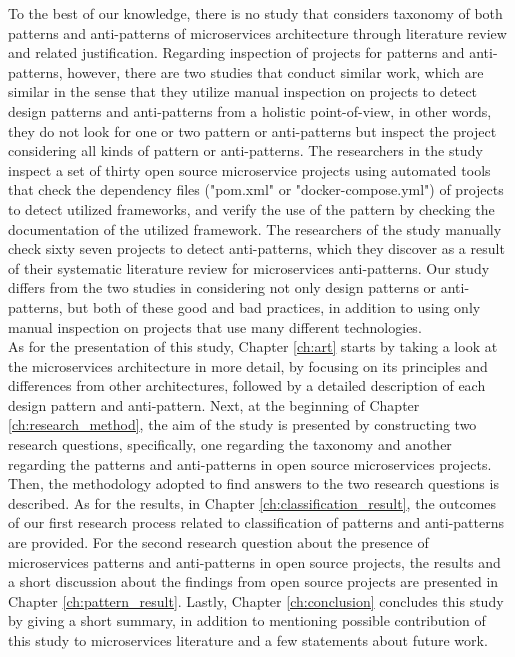 \documentclass{Configuration_Files/PoliMi3i_thesis}
\begin{document}
To the best of our knowledge, there is no study that considers taxonomy of both patterns and anti-patterns of microservices architecture through literature review and related justification.
Regarding inspection of projects for patterns and anti-patterns, however, there are two studies that conduct similar work, which are similar in the sense that they utilize manual inspection on projects to detect design patterns and anti-patterns from a holistic point-of-view, in other words, they do not look for one or two pattern or anti-patterns but inspect the project considering all kinds of pattern or anti-patterns.
The researchers in the study \cite{8719492} inspect a set of thirty open source microservice projects using automated tools that check the dependency files ("pom.xml" or "docker-compose.yml") of projects to detect utilized frameworks, and verify the use of the pattern by checking the documentation of the utilized framework.
The researchers of the study \cite{10.1145/3424771.3424812} manually check sixty seven projects to detect anti-patterns, which they discover as a result of their systematic literature review for microservices anti-patterns.
Our study differs from the two studies in considering not only design patterns or anti-patterns, but both of these good and bad practices, in addition to using only manual inspection on projects that use many different technologies.
\\
As for the presentation of this study, Chapter \ref{ch:art} starts by taking a look at the microservices architecture in more detail, by focusing on its principles and differences from other architectures, followed by a detailed description of each design pattern and anti-pattern.
Next, at the beginning of Chapter \ref{ch:research_method}, the aim of the study is presented by constructing two research questions, specifically, one regarding the taxonomy and another regarding the patterns and anti-patterns in open source microservices projects.
Then, the methodology adopted to find answers to the two research questions is described.
As for the results, in Chapter \ref{ch:classification_result}, the outcomes of our first research process related to classification of patterns and anti-patterns are provided.
For the second research question about the presence of microservices patterns and anti-patterns in open source projects, the results and a short discussion about the findings from open source projects are presented in Chapter \ref{ch:pattern_result}.
Lastly, Chapter \ref{ch:conclusion} concludes this study by giving a short summary, in addition to mentioning possible contribution of this study to microservices literature and a few statements about future work.
\end{document}
